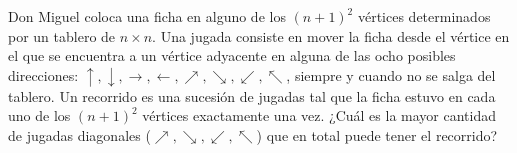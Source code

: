 Don Miguel coloca una ficha en alguno de los $(n+1)^2$ vértices determinados por un tablero de $n \times n$. Una jugada consiste en mover la ficha desde el vértice en el que se encuentra a un vértice adyacente en alguna de las ocho posibles direcciones: $\uparrow, \downarrow, \rightarrow, \leftarrow, \nearrow, \searrow, \swarrow, \nwarrow$, siempre y cuando no se salga del tablero. Un recorrido es una sucesión de jugadas tal que la ficha estuvo en cada uno de los $(n+1)^2$ vértices exactamente una vez. ¿Cuál es la mayor cantidad de jugadas diagonales ($\nearrow, \searrow, \swarrow, \nwarrow$) que en total puede tener el recorrido?
